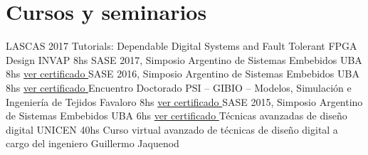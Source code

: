 \documentclass[11pt,a4paper,sans]{moderncv}  %
\begin{document}
\section{Cursos y seminarios}

 { LASCAS 2017 Tutorials: Dependable Digital Systems and Fault Tolerant FPGA Design } { INVAP                                     } { 8hs                                                                } { }                                                                                               { }                                                                                                                 { }
 { SASE 2017, Simposio Argentino de Sistemas Embebidos                              } { UBA                                       } { 8hs                                                                } { \href                                                                                           { http://disenioconingenio.com.ar/producto.php?products_id=444                            }                         { ver certificado }  } { } { }
 { SASE 2016, Simposio Argentino de Sistemas Embebidos                              } { UBA                                       } { 8hs                                                                } { \href                                                                                           { http://disenioconingenio.com.ar/producto.php?products_id=443                            }                         { ver certificado }  } { } { }
 { Encuentro Doctorado PSI – GIBIO – Modelos, Simulación e Ingeniería de Tejidos    } { Favaloro                                  } { 8hs                                                                } { \href                                                                                           { http://disenioconingenio.com.ar/producto.php?products_id=419                            }                         { ver certificado }  } { } { }
 { SASE 2015, Simposio Argentino de Sistemas Embebidos                              } { UBA                                       } { 6hs                                                                } { \href                                                                                           { http://disenioconingenio.com.ar/producto.php?products_id=411                            }                         { ver certificado }  } { } { }
 { Técnicas avanzadas de diseño digital                                             } { UNICEN                                    } { 40hs                                                               } { Curso virtual avanzado de técnicas de diseño digital a cargo del ingeniero Guillermo Jaquenod } { }                                                                                                                 { }
\end{document}
